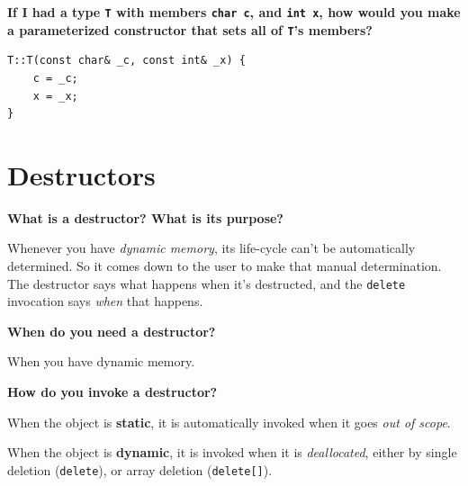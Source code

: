 \documentclass[letterpaper, 12pt]{article}
\newcommand{\question}[1]{\textbf{#1}\par}
\newenvironment{ansblock}{\color{Green4}}{\normalcolor\vspace{1em}}
\begin{document}
\question{If I had a type \texttt{T} with members \texttt{char c}, and
\texttt{int x}, how would you make a parameterized constructor that sets all of
\texttt{T}'s members?}

\begin{verbatim}
T::T(const char& _c, const int& _x) {
    c = _c;
    x = _x;
}
\end{verbatim}

\pagebreak
\section{Destructors}
\question{What is a destructor? What is its purpose?}
\begin{ansblock}
Whenever you have \emph{dynamic memory}, its life-cycle can't be automatically
determined. So it comes down to the user to make that manual determination. The
destructor says what happens when it's destructed, and the \texttt{delete}
invocation says \emph{when} that happens.
\end{ansblock}

\question{When do you need a destructor?}
\begin{ansblock}
When you have dynamic memory.
\end{ansblock}

\question{How do you invoke a destructor?}
\begin{ansblock}
When the object is \textbf{static}, it is automatically invoked when it goes
\emph{out of scope}.

\vspace{1em}

When the object is \textbf{dynamic}, it is invoked when it is
\emph{deallocated}, either by single deletion (\texttt{delete}), or array
deletion (\texttt{delete[]}).
\end{ansblock}
\end{document}
